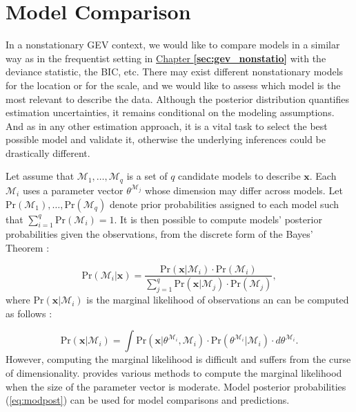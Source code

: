 

\section{Model Comparison}\label{sec:modcompbay}


In a nonstationary GEV context, we would like to compare models in a similar way as in the frequentist setting in \hyperref[sec:gev_nonstatio]{Chapter \textbf{\ref{sec:gev_nonstatio}}} with the deviance statistic, the BIC, etc.
There may exist different nonstationary models for the location or for the scale, and we would like to assess which model is the most relevant to describe the data.
Although the posterior distribution quantifies estimation uncertainties, it remains conditional on the modeling assumptions. And as in any other estimation approach, it is a vital task to select the best possible model and validate it, otherwise the underlying inferences could be drastically different. 

Let assume that $\mathcal{M}_1,\ldots,\mathcal{M}_q$ is a set of $q$ candidate models to describe $\boldsymbol{x}$. Each $\mathcal{M}_i$ uses a parameter vector $\theta^{\mathcal{M}_j}$ whose dimension may differ across models. Let $\text{Pr}(\mathcal{M}_1),\ldots,\text{Pr}(\mathcal{M}_q)$ denote prior probabilities assigned to each model such that $\sum_{i=1}^q \text{Pr}(\mathcal{M}_i)=1$.
It is then possible to compute models' posterior probabilities given the observations, from the discrete form of the Bayes' Theorem : 

\begin{equation}\label{eq:modpost}
\text{Pr}(\mathcal{M}_i|\boldsymbol{x})=\frac{\text{Pr}(\boldsymbol{x}|\mathcal{M}_i)\cdot \text{Pr}(\mathcal{M}_i)}{\sum_{j=1}^q \text{Pr}(\boldsymbol{x}|\mathcal{M}_j)\cdot \text{Pr}(\mathcal{M}_j)},
\end{equation}
where $\text{Pr}(\boldsymbol{x}|\mathcal{M}_i)$ is the marginal likelihood of observations an can be computed as follows : 

\begin{equation}\label{eq:marglik}
\text{Pr}(\boldsymbol{x}|\mathcal{M}_i)=\int \text{Pr}(\boldsymbol{x}|\theta^{\mathcal{M}_i},\mathcal{M}_i)\cdot \text{Pr}(\theta^{\mathcal{M}_i}|\mathcal{M}_i)\cdot d\theta^{\mathcal{M}_i}.
\end{equation}
However, computing the marginal likelihood is difficult and suffers from the curse of dimensionality. \citet{Bos2002} provides various methods to compute the marginal likelihood when the size of the parameter vector is moderate.
Model posterior probabilities (\ref{eq:modpost}) can be used for model comparisons and predictions.


